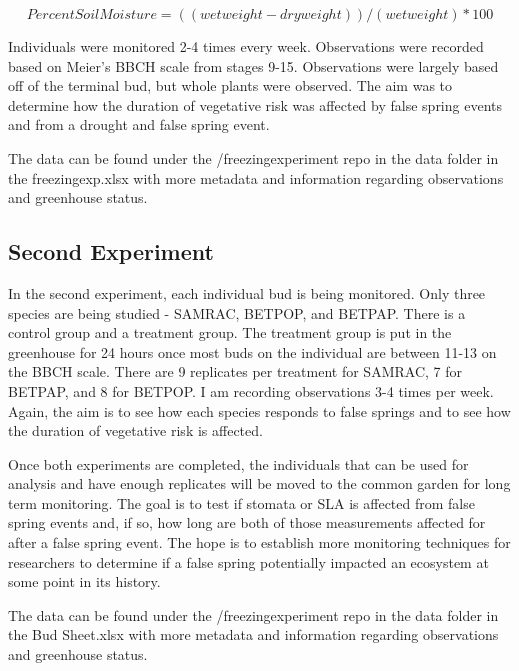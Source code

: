 \documentclass{article}\usepackage[]{graphicx}\usepackage[]{color}
\begin{document}
\[ Percent Soil Moisture = ((wet weight - dry weight))/(wet weight) * 100 \]

Individuals were monitored 2-4 times every week. Observations were recorded based on Meier's BBCH scale from stages 9-15. Observations were largely based off of the terminal bud, but whole plants were observed. The aim was to determine how the duration of vegetative risk was affected by false spring events and from a drought and false spring event. 

The data can be found under the /freezingexperiment repo in the data folder in the freezingexp.xlsx with more metadata and information regarding observations and greenhouse status. 


\subsection*{\textbf{Second Experiment}}
In the second experiment, each individual bud is being monitored. Only three species are being studied - SAMRAC, BETPOP, and BETPAP. There is a control group and a treatment group. The treatment group is put in the greenhouse for 24 hours once most buds on the individual are between 11-13 on the BBCH scale. There are 9 replicates per treatment for SAMRAC, 7 for BETPAP, and 8 for BETPOP. I am recording observations 3-4 times per week. Again, the aim is to see how each species responds to false springs and to see how the duration of vegetative risk is affected. 

Once both experiments are completed, the individuals that can be used for analysis and have enough replicates will be moved to the common garden for long term monitoring. The goal is to test if stomata or SLA is affected from false spring events and, if so, how long are both of those measurements affected for after a false spring event. The hope is to establish more monitoring techniques for researchers to determine if a false spring potentially impacted an ecosystem at some point in its history. 


The data can be found under the /freezingexperiment repo in the data folder in the Bud Sheet.xlsx with more metadata and information regarding observations and greenhouse status. 
\end{document}
